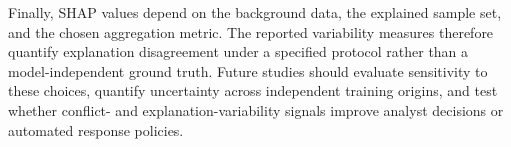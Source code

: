 Finally, \gls{SHAP} values depend on the background data, the explained sample set, and the chosen aggregation metric. The reported variability measures therefore quantify explanation disagreement under a specified protocol rather than a model-independent ground truth. Future studies should evaluate sensitivity to these choices, quantify uncertainty across independent training origins, and test whether conflict- and explanation-variability signals improve analyst decisions or automated response policies.

